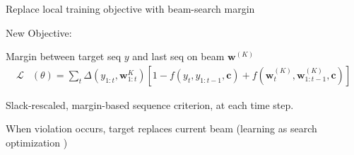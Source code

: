 \documentclass{beamer}
\let\tempone\itemize
\let\temptwo\enditemize
\renewenvironment{itemize}{\tempone\addtolength{\itemsep}{0.5\baselineskip}}{\temptwo}
\newcommand{\wvec}{\mathbf{w}}
\newcommand{\cvec}{\mathbf{c}}
\newcommand{\Cite}[1]{{\footnotesize \citep{#1}}}
\begin{document}
\begin{frame}
  \begin{center}
     Replace local training objective with beam-search margin 
  \end{center}

  New Objective: 
  \begin{itemize}

  \item Margin between target seq $y$ and last seq on beam $\wvec^{(K)}$  
  \end{itemize}
\begin{align*}
 \mathcal{L}&(\theta) = \sum_{t} \Delta(y_{1:t}, \wvec_{1:t}^{K}) \left[1 - f(y_t, y_{1:t-1}, \cvec) +  f(\wvec_t^{(K)}, \wvec_{1:t-1}^{(K)}, \cvec) \right] 
\end{align*}

\begin{itemize}
  \item Slack-rescaled, margin-based sequence criterion, at each time step.  
\item When violation occurs, target replaces current beam (learning as search optimization \Cite{daume05learning})
\end{itemize}

\end{frame}
\end{document}
